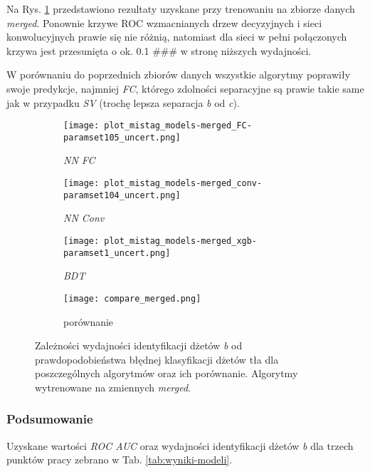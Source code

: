 Na Rys. \ref{fig:ROC_merged} przedstawiono rezultaty uzyskane przy trenowaniu na zbiorze danych \textit{merged}.
Ponownie krzywe ROC wzmacnianych drzew decyzyjnych i sieci konwolucyjnych prawie się nie różnią, natomiast dla sieci w pełni połączonych krzywa jest przesunięta o ok. 0.1 \#\#\# w stronę niższych wydajności.

W porównaniu do poprzednich zbiorów danych wszystkie algorytmy poprawiły swoje predykcje, najmniej \textit{FC}, którego zdolności separacyjne są prawie takie same jak w przypadku \textit{SV} (trochę lepsza separacja \textit{b} od \textit{c}).

\begin{figure}[ht]
	\centering
	
    \begin{subfigure}[b]{0.49\textwidth}
	\texttt{[image: plot\_mistag\_models-merged\_FC-paramset105\_uncert.png]}
	\caption{\textit{NN FC}}
	\end{subfigure}
    \begin{subfigure}[b]{0.49\textwidth}
	\texttt{[image: plot\_mistag\_models-merged\_conv-paramset104\_uncert.png]}	
	\caption{\textit{NN Conv}}
	\end{subfigure}
    \begin{subfigure}[b]{0.49\textwidth}
	\texttt{[image: plot\_mistag\_models-merged\_xgb-paramset1\_uncert.png]}
	\caption{\textit{BDT}}
	\end{subfigure}
	\begin{subfigure}[b]{0.49\textwidth}
	\texttt{[image: compare\_merged.png]}
	\caption{porównanie}
	\end{subfigure}
	
	\caption{Zależności wydajności identyfikacji dżetów \textit{b} od prawdopodobieństwa błędnej klasyfikacji dżetów tła dla poszczególnych algorytmów oraz ich porównanie. Algorytmy wytrenowane na zmiennych \textit{merged}.}
	\label{fig:ROC_merged}
\end{figure}

\FloatBarrier
\subsubsection{Podsumowanie}
\label{subsubsec:wyniki-modeli-podsum}

Uzyskane wartości \textit{ROC AUC} oraz wydajności identyfikacji dżetów \textit{b} dla trzech punktów pracy zebrano w Tab. \ref{tab:wyniki-modeli}.


